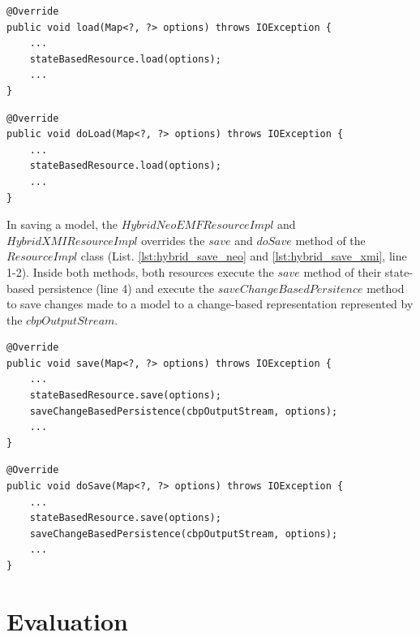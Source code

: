 \documentclass[10pt,conference]{IEEEtran}
\begin{document}
\begin{lstlisting}[style=java,caption={The simplified $load$ method of the hybrid model persistence with NeoEMF as its state-based resource.},label=lst:hybrid_load_neo]
@Override
public void load(Map<?, ?> options) throws IOException {
    ... 
    stateBasedResource.load(options);
    ...
}
\end{lstlisting}

\begin{lstlisting}[style=java,caption={The simplified $load$ method of the hybrid model persistence with XMI as its state-based resource.},label=lst:hybrid_load_xmi]
@Override
public void doLoad(Map<?, ?> options) throws IOException {
    ... 
    stateBasedResource.load(options);
    ...
}
\end{lstlisting}

In saving a model, the  $HybridNeoEMFResourceImpl$ and $HybridXMIResourceImpl$ overrides the $save$ and $doSave$ method of the $ResourceImpl$ class (List. \ref{lst:hybrid_save_neo} and \ref{lst:hybrid_save_xmi}, line 1-2). Inside both methods, both resources execute the $save$ method of their state-based persistence (line 4) and execute the $saveChangeBasedPersitence$ method to save changes made to a model to a change-based representation represented by the $cbpOutputStream$.

\begin{lstlisting}[style=java,caption={A simplified code to save a model to both state and change-based representation of the hybrid model persistence.},label=lst:hybrid_save_neo]
@Override
public void save(Map<?, ?> options) throws IOException {
    ...
    stateBasedResource.save(options);
    saveChangeBasedPersistence(cbpOutputStream, options);
    ...
}
\end{lstlisting}

\begin{lstlisting}[style=java,caption={A simplified code to save a model to both state and change-based representation of the hybrid model persistence.},label=lst:hybrid_save_xmi]
@Override
public void doSave(Map<?, ?> options) throws IOException {
    ...
    stateBasedResource.save(options);
    saveChangeBasedPersistence(cbpOutputStream, options);
    ...
}
\end{lstlisting}

\section{Evaluation}
\label{sec:evaluation}
\end{document}
